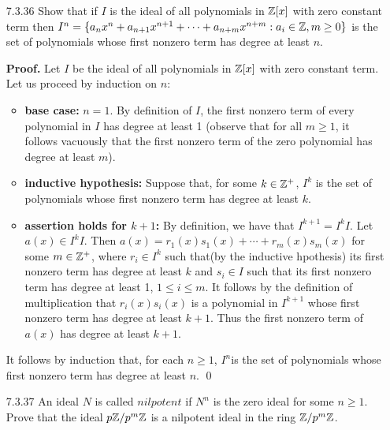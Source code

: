 \begin{enumerate}
\begin{enumerate}
               Conclude that $I \cap (J + K) = J + (I \cap K)$. \qed
      \end{enumerate}
   \item[7.3.36]  Show that if $I$ is the ideal of all polynomials in $\mathbb{Z}[x]$
                  with zero constant term then $I^n = \{a_nx^n + a_{n+1}x^{n+1} 
                  + \cdots + a_{n+m}x^{n+m} : a_i \in \mathbb{Z}, m \ge 0\}$ is the set
                  of polynomials whose first nonzero term has degree at least
                  $n$.

      \textbf{Proof.} Let $I$ be the ideal of all polynomials in $\mathbb{Z}[x]$ with 
      zero constant term. Let us proceed by induction on $n$:

      \begin{itemize}
         \item \textbf{base case:} $n = 1$. By definition of $I$, the first 
               nonzero term of every polynomial in $I$ has degree at least 
               1 (observe that for all $m \ge 1$, it follows vacuously that the
               first nonzero term of the zero polynomial has degree at least
               $m$).

         \item \textbf{inductive hypothesis:} Suppose that, for some
               $k \in \mathbb{Z}^+$, $I^k$ is the set of polynomials whose first nonzero 
               term has degree at least $k$.
         \item \textbf{assertion holds for $k+1$:} By definition, we have that
               $I^{k+1} = I^kI$. Let $a(x) \in I^kI$. Then
               $a(x) = r_1(x)s_1(x) + \cdots + r_m(x)s_m(x)$ for some
               $m \in \mathbb{Z}^+$, where $r_i \in I^k$ such that(by the inductive
               hpothesis) its first nonzero term has degree at least $k$ and 
               $s_i \in I$ such that its first nonzero term has degree at least 
               1, $1\le i \le m$. It follows by the definition of multiplication 
               that $r_i(x)s_i(x)$ is a polynomial in $I^{k+1}$ whose first
               nonzero term has degree at least $k + 1$. Thus the first nonzero
               term of $a(x)$ has degree at least $k + 1$.            
      \end{itemize}
      It follows by induction that, for each $n \ge 1$, $I^n$is the set of
      polynomials whose first nonzero term has degree at least $n$. \qed
   \item[7.3.37]  An ideal $N$ is called $\textit{nilpotent}$ if $N^n$ is the
                  zero ideal for some $n \ge 1$. Prove that the ideal
                  $p\mathbb{Z}/p^m\mathbb{Z}$ is a nilpotent ideal in the ring $\mathbb{Z}/p^m\mathbb{Z}$.


\end{enumerate}
